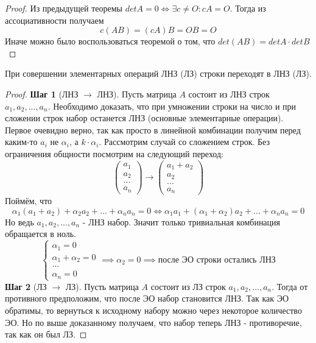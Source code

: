 \documentclass[11pt]{article}
\begin{document}
\begin{proof}
    Из предыдущей теоремы $detA = 0 \Longleftrightarrow \exists c \neq O: cA = O$. 
    Тогда из ассоциативности получаем \[c(AB) = (cA)B = OB = O\] 
    Иначе можно было воспользоваться теоремой о том, что $det(AB) = detA \cdot detB$
\end{proof}

\begin{theorem}
    При совершении элементарных операций ЛНЗ (ЛЗ) строки переходят в ЛНЗ (ЛЗ).
\end{theorem}

\begin{proof}
    \textbf{Шаг 1} (ЛНЗ $\rightarrow $ ЛНЗ). Пусть матрица $A$ состоит из ЛНЗ строк 
    $a_1, a_2, ..., a_n$. Необходимо доказать, что при умножении строки на число и 
    при сложении строк набор останется ЛНЗ 
    (основные элементарные операции). Первое очевидно верно, так как просто в линейной 
    комбинации получим перед каким-то $a_i$ не $\alpha_i$, а $k \cdot \alpha_i$. 
    Рассмотрим случай со сложением строк. Без ограничения общности посмотрим на 
    следующий переход: \[\begin{pmatrix} a_1 \\ a_2 \\ ... \\ a_n \end{pmatrix} 
    \longrightarrow \begin{pmatrix} a_1 + a_2 \\ a_2 \\ ... \\ a_n \end{pmatrix}\]
    Поймём, что \[\alpha_1(a_1 + a_2) + \alpha_2a_2 + ... + \alpha_na_n = 0 
    \Longleftrightarrow \alpha_1a_1 + (\alpha_1 + \alpha_2)a_2 + ... + \alpha_na_n = 0\] 
    Но ведь $a_1, a_2, ..., a_n$ - ЛНЗ набор. Значит только тривиальная комбинация 
    обращается в ноль. \[\begin{cases} \alpha_1 = 0 \\ \alpha_1 + \alpha_2 = 0 \\ 
    ... \\ \alpha_n = 0 \end{cases} \implies \alpha_2 = 0 \implies \text{после ЭО строки 
    остались ЛНЗ}\]
    \textbf{Шаг 2} (ЛЗ $\rightarrow $ ЛЗ). Пусть матрица $A$ состоит из ЛЗ строк 
    $a_1, a_2, ..., a_n$. Тогда от противного предположим, что после ЭО набор 
    становится ЛНЗ. Так как ЭО обратимы, то вернуться к исходному набору можно через 
    некоторое количество ЭО. Но по выше доказанному получаем, что набор теперь ЛНЗ - 
    противоречие, так как он был ЛЗ.
\end{proof}
\end{document}
